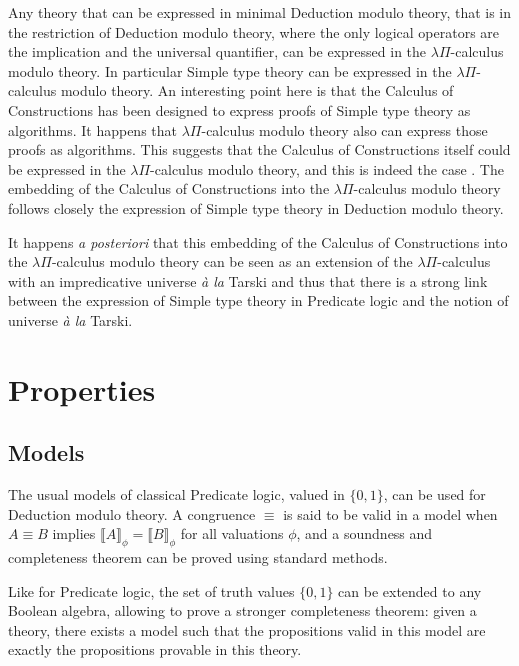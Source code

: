 \documentclass{llncs}
\begin{document}
Any theory that can be expressed in minimal Deduction modulo theory,
that is in the restriction of Deduction modulo theory, where the only
logical operators are the implication and the universal quantifier,
can be expressed in the $\lambda \Pi$-calculus modulo theory. In
particular Simple type theory can be expressed in the $\lambda
\Pi$-calculus modulo theory. An interesting point here is that the
Calculus of Constructions \cite{CoquandHuet} has been designed to
express proofs of Simple type theory as algorithms.  It happens that
$\lambda \Pi$-calculus modulo theory also can express those proofs as
algorithms. This suggests that the Calculus of Constructions itself
could be expressed in the $\lambda \Pi$-calculus modulo theory, and
this is indeed the case \cite{CousineauDowek}. The embedding of the
Calculus of Constructions into the $\lambda \Pi$-calculus modulo
theory follows closely the expression of Simple type theory in
Deduction modulo theory.

It happens {\em a posteriori} that this embedding of the 
Calculus of Constructions into the $\lambda \Pi$-calculus modulo theory 
can be seen as an extension of the $\lambda \Pi$-calculus with an 
impredicative universe {\em \`a la} Tarski \cite{Assaf} 
and thus that there is a strong 
link between the expression of Simple type theory in Predicate logic and 
the notion of universe {\em \`a la} Tarski.

\section{Properties}

\subsection{Models}

The usual models of classical Predicate logic, valued in $\{0,1\}$, 
can be used for Deduction modulo theory. A congruence $\equiv$ is said 
to be valid in a model when $A \equiv B$ implies 
$\llbracket A \rrbracket_{\phi} =
\llbracket B \rrbracket_{\phi}$ for all valuations $\phi$, and a
soundness and completeness theorem can be proved using standard 
methods.

Like for Predicate logic, the set of truth values $\{0,1\}$ can be
extended to any Boolean algebra, allowing to prove a stronger
completeness theorem: given a theory, 
there exists a model such that the propositions
valid in this model are exactly the propositions provable in this
theory.
\end{document}
